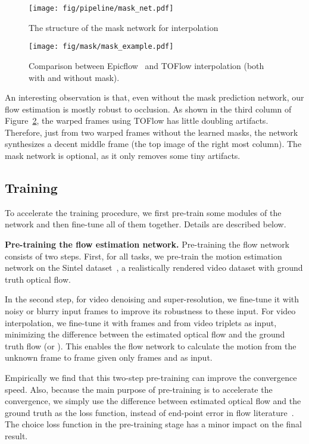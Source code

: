 \documentclass[twocolumn,natbib]{svjour3}          \smartqed  \usepackage{graphicx}
\newcommand{\fig}[1]{Figure~\ref{#1}}
\def\toflow{TOFlow\xspace}
\def\flownet{motion estimation\xspace}
\newcommand{\myparagraph}[1]{\vspace{5pt}\noindent\textbf{#1}}
\begin{document}
\begin{figure}[t]
    \centering
    \texttt{[image: fig/pipeline/mask\_net.pdf]}
    \caption{The structure of the mask network for interpolation}
    \label{fig:mask_net}
\end{figure} \begin{figure}[t]
    \centering
    \texttt{[image: fig/mask/mask\_example.pdf]}
\caption{Comparison between Epicflow~\citep{Revaud2015Epicflow} and TOFlow interpolation (both with and without mask).}
\label{fig:mask_example}
\end{figure}

 

An interesting observation is that, even without the mask prediction network, our flow estimation is mostly robust to occlusion. As shown in the third column of \fig{fig:mask_example}, the warped frames using \toflow has little doubling artifacts. Therefore, just from two warped frames without the learned masks, the network synthesizes a decent middle frame (the top image of the right most column). The mask network is optional, as it only removes some tiny artifacts. 


\subsection{Training}
\label{sect:training}


To accelerate the training procedure, we first pre-train some modules of the network and then fine-tune all of them together. Details are described below.

\myparagraph{Pre-training the flow estimation network. }
Pre-training the flow network consists of two steps. First, for all tasks, we pre-train the \flownet network on the Sintel dataset~\citep{Butler2012naturalistic}, a realistically rendered video dataset with ground truth optical flow. 

In the second step, for video denoising and super-resolution, we fine-tune it with noisy or blurry input frames to improve its robustness to these input. For video interpolation, we fine-tune it with frames  and  from video triplets as input, minimizing the  difference between the estimated optical flow and the ground truth flow  (or ). This enables the flow network to calculate the motion from the unknown frame  to frame  given only frames  and  as input.

Empirically we find that this two-step pre-training can improve the convergence speed. Also, because the main purpose of pre-training is to accelerate the convergence, we simply use the  difference between estimated optical flow and the ground truth as the loss function, instead of end-point error in flow literature~\citep{Brox2009Large,Butler2012naturalistic}. The choice loss function in the pre-training stage has a minor impact on the final result.
\end{document}
